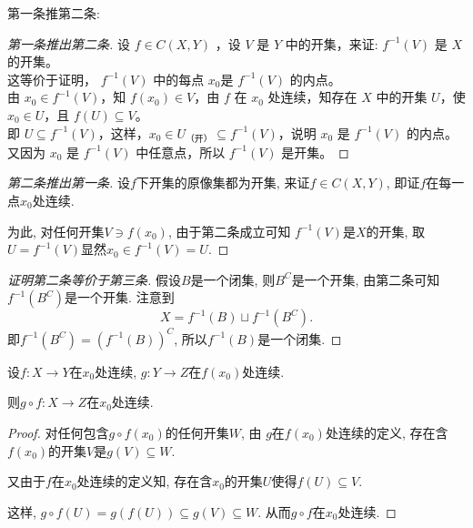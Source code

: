 第一条推第二条: 
\begin{proof}[第一条推出第二条]
    设 $f \in C(X,Y )$ ，设 $V $ 是 $Y $ 中的开集，来证: $f^{-1}(V)$ 是 $X $ 的开集。\\
    这等价于证明， $f ^{-1} (V)$ 中的每点 $x_0$是 $f^{-1}(V)$ 的内点。\\
    由 $x_0 \in f^{-1}(V)$，知 $f(x_0) \in V$，由 $f $ 在 $x_0$ 处连续，知存在 $X$ 中的开集 $U$，使 $x_0 \in U$，且 $f(U) \subseteq V$。\\  
    即 $U \subseteq f^{-1}(V)$，这样，$x_0 \in U_{\text{（开）}} \subseteq f^{-1}(V)$，说明 $x_0$ 是 $f^{-1}(V)$ 的内点。\\
    又因为 $x_0$ 是 $f^{-1}(V)$ 中任意点，所以 $f^{-1}(V)$ 是开集。
\end{proof}


% 
% 
% 
% 
% 
% 
% 
\begin{proof}[第二条推出第一条]
    设$f$下开集的原像集都为开集, 来证$f \in C\left( X,Y \right) $, 即证$f$在每一点$x_0$处连续. 
    
    为此, 对任何开集$V \ni f\left( x_0 \right) $, 由于第二条成立可知 $f^{-1}\left( V \right) $是$X$的开集, 取$U = f^{-1} \left( V \right)$显然$x_0 \in f^{-1} \left( V \right)  = U$.
\end{proof}

\begin{proof}[证明第二条等价于第三条]
    假设$B$是一个闭集, 则$B^{C}$是一个开集, 由第二条可知$f^{-1} \left( B^{C} \right) $是一个开集. 注意到
    \begin{equation}
      X = f^{-1} \left( B \right) \sqcup f^{-1} \left( B^{C} \right) .
    \end{equation}
    即$ f^{-1} \left( B^{C} \right) = \left( f^{-1} \left( B \right)  \right) ^{C}$,
    所以$f^{-1} \left( B \right) $是一个闭集.
\end{proof}

\begin{theorem}[连续映射的复合是连续的]
    设$f \colon X \to Y$在$x_0$处连续, $g \colon Y \to Z$在$f\left( x_0 \right) $处连续.
    
    则$g \circ f \colon X \to Z$在$x_0$处连续.
\end{theorem}
\begin{proof}
    对任何包含$g \circ f\left( x_0 \right) $的任何开集$W$, 由 $g$在$f\left( x_0 \right) $处连续的定义, 存在含$f\left( x_0 \right) $的开集$V$是$g\left( V  \right) \subseteq W$.

    又由于$f$在$x_0$处连续的定义知, 存在含$x_0$的开集$U$使得$f\left( U \right) \subseteq V$.

    这样, $g \circ f \left( U \right) = g\left( f\left( U \right)  \right) \subseteq g\left( V \right) \subseteq W$. 从而$g \circ f$在$x_0$处连续.
\end{proof}

